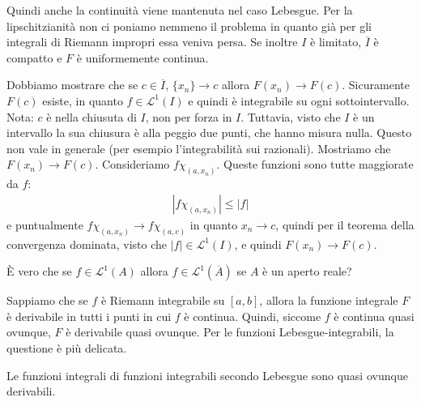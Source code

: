\documentclass[a4paper]{article}
\begin{document}
\begin{radioactive}
Quindi anche la continuità viene mantenuta nel caso Lebesgue.
Per la lipschitzianità non ci poniamo nemmeno il problema in quanto
già per gli integrali di Riemann impropri essa veniva persa.
Se inoltre \(I\) è limitato, \(\overline I\) è compatto e \(F\) è uniformemente continua.
\end{radioactive}

\begin{radioactive}
\begin{snippetproof}{}
    Dobbiamo mostrare che se \(c \in \overline I\),
    \(\{x_n\} \to c\) allora \(F(x_n) \to F(c)\).
    Sicuramente \(F(c)\) esiste, in quanto \(f \in \mathcal L^1(I)\)
    e quindi è integrabile su ogni sottointervallo.
    Nota: \(c\) è nella chiusuta di \(I\), non per forza in \(I\).
    Tuttavia, visto che \(I\) è un intervallo
    la sua chiusura è alla peggio due punti, che hanno misura nulla. Questo non vale in generale
    (per esempio l'integrabilità sui razionali).
    Mostriamo che \(F(x_n) \to F(c)\).
    Consideriamo \(f \chi_{(a,x_n)}\).
    Queste funzioni sono tutte maggiorate da \(f\):
    \begin{align*}
        |f \chi_{(a,x_n)}| \leq |f|
    \end{align*}
    e puntualmente \(f \chi_{(a,x_n)} \to f \chi_{(a,c)}\)
    in quanto \(x_n \to c\),
    quindi per il teorema della convergenza dominata, visto che \(|f| \in \mathcal L^1(I)\),
    e quindi \(F(x_n) \to F(c)\).
\end{snippetproof}
\end{radioactive}

\begin{radioactive}
\begin{snippetexercise}{}
    È vero che se \(f \in \mathcal L^1(A)\) allora \(f \in \mathcal L^1(\overline A)\)
    se \(A\) è un aperto reale?
\end{snippetexercise}
\end{radioactive}

\begin{radioactive}
Sappiamo che se \(f\) è Riemann integrabile su \([a,b]\),
allora la funzione integrale \(F\) è derivabile in tutti i punti in cui \(f\) è continua.
Quindi, siccome \(f\) è continua quasi ovunque, \(F\) è derivabile quasi ovunque.
Per le funzioni Lebesgue-integrabili, la questione è più delicata.
\end{radioactive}

\begin{radioactive}
\begin{snippettheorem}{}
    Le funzioni integrali di funzioni integrabili secondo Lebesgue
    sono quasi ovunque derivabili.
\end{snippettheorem}
\end{radioactive}
\end{document}
